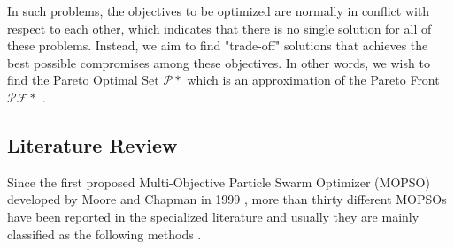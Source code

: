 \documentclass[11pt, runningheads,a4paper]{llncs}
\begin{document}
In such problems, the objectives to be optimized are normally in conflict with respect to each other, which indicates that there is no single solution for all of these problems. Instead, we aim to find "trade-off" solutions that achieves the best possible compromises among these objectives. In other words, we wish to find the Pareto Optimal Set $\mathcal{P}*$ which is an approximation of the Pareto Front $\mathcal{PF}*$ \cite{mosurvey}. 

\subsection{Literature Review}
Since the first proposed Multi-Objective Particle Swarm Optimizer (MOPSO) developed by Moore and Chapman in 1999 \cite{moore1999}, more than thirty different MOPSOs have been reported in the specialized literature and usually they are mainly classified as the following methods \cite{mosurvey}.
\end{document}
